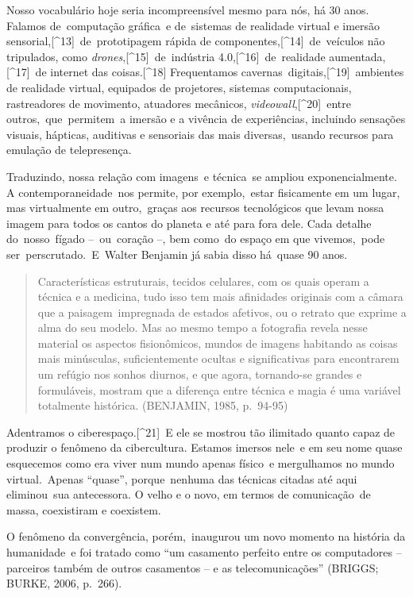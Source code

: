 \documentclass[
  letterpaper,
]{abntex2}
\begin{document}
Nosso vocabulário hoje seria incompreensível mesmo para nós, há 30 anos.
Falamos de~computação gráfica~e de~sistemas de realidade virtual e
imersão sensorial,{[}\^{}13{]}~de~prototipagem rápida de
componentes,{[}\^{}14{]}~de~veículos não tripulados, como
\emph{drones},{[}\^{}15{]}~de~indústria 4.0,{[}\^{}16{]}~de~realidade
aumentada,{[}\^{}17{]}~de internet das coisas.{[}\^{}18{]} Frequentamos
cavernas~digitais,{[}\^{}19{]}~ambientes de realidade virtual, equipados
de projetores, sistemas computacionais, rastreadores de movimento,
atuadores mecânicos, \emph{videowall},{[}\^{}20{]}~entre
outros,~que~permitem~a imersão e a vivência de experiências, incluindo
sensações visuais, hápticas, auditivas e sensoriais das mais
diversas,~usando recursos para emulação de telepresença.

Traduzindo, nossa relação com imagens~e técnica~se ampliou
exponencialmente. A contemporaneidade~nos permite, por exemplo,~estar
fisicamente em um lugar, mas virtualmente em outro,~graças aos recursos
tecnológicos que levam nossa imagem para todos os cantos do planeta e
até para fora dele. Cada detalhe do~nosso~fígado --~ou~coração --, bem
como~do espaço em que vivemos,~pode ser~perscrutado.~E~Walter Benjamin
já sabia disso há~quase 90 anos.~ ~

\begin{quote}
Características estruturais, tecidos celulares, com os quais operam a
técnica e a medicina, tudo isso tem mais afinidades originais com a
câmara que a paisagem~impregnada de estados afetivos, ou o retrato que
exprime a alma do seu modelo. Mas ao mesmo tempo a fotografia revela
nesse material os aspectos fisionômicos, mundos de imagens habitando as
coisas mais minúsculas, suficientemente ocultas e significativas para
encontrarem um refúgio nos sonhos diurnos, e que agora, tornando-se
grandes e formuláveis, mostram que a diferença entre técnica e magia é
uma variável totalmente histórica. (BENJAMIN, 1985, p.~94-95)~ ~
\end{quote}

Adentramos o ciberespaço.{[}\^{}21{]}~E ele se mostrou tão ilimitado
quanto capaz de produzir o fenômeno da cibercultura. Estamos imersos
nele~e em seu nome quase esquecemos como era viver num mundo apenas
físico~e mergulhamos no mundo virtual.~Apenas ``quase'', porque~nenhuma
das técnicas citadas até aqui eliminou~sua antecessora. O velho e o
novo, em termos de comunicação~de massa, coexistiram e coexistem.

O fenômeno da convergência, porém,~inaugurou um novo momento na história
da humanidade~e foi tratado como ``um casamento perfeito entre os
computadores -- parceiros também de outros casamentos -- e as
telecomunicações'' (BRIGGS; BURKE, 2006, p.~266).~
\end{document}
